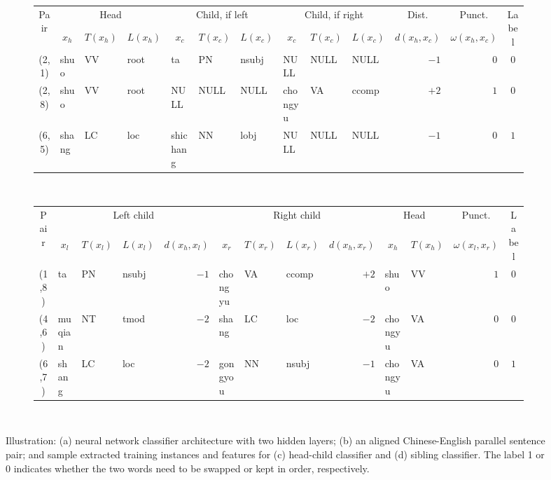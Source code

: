 \documentclass[letterpaper]{article}
\begin{document}
\begin{figure}[htb]
\begin{subfigure}[b]{1\textwidth}
{\centering
\footnotesize
\begin{tabular}{|c|l|l|l|l|l|l|l|l|l|r|r|c|}
\hline
\multicolumn{1}{|c|}{\multirow{2}{*}{Pair}} & \multicolumn{3}{c|}{Head} & \multicolumn{3}{c|}{Child, if left} & \multicolumn{3}{c|}{Child, if right} & \multicolumn{1}{c|}{Dist.} & \multicolumn{1}{c|}{Punct.} & \multicolumn{1}{c|}{\multirow{2}{*}{Label}} \\
\cline{2-12}
 & \multicolumn{1}{c|}{$x_h$} & \multicolumn{1}{c|}{$T(x_h)$} & \multicolumn{1}{c|}{$L(x_h)$} & \multicolumn{1}{c|}{$x_c$} & \multicolumn{1}{c|}{$T(x_c)$} & \multicolumn{1}{c|}{$L(x_c)$} & \multicolumn{1}{c|}{$x_c$} & \multicolumn{1}{c|}{$T(x_c)$} & \multicolumn{1}{c|}{$L(x_c)$} & \multicolumn{1}{c|}{$d(x_h,x_c)$} & \multicolumn{1}{c|}{$\omega(x_h,x_c)$} &  \\
\hline
(2, 1) & shuo & VV & root & ta & PN & nsubj & NULL & NULL & NULL & $-1$ & $0$ & $0$\\
(2, 8) & shuo & VV & root & NULL & NULL & NULL & chongyu & VA & ccomp & $+2$ & $1$ & $0$\\
(6, 5) & shang & LC & loc & shichang & NN & lobj & NULL & NULL & NULL & $-1$ & $0$ & $1$\\
\hline
\end{tabular}
\caption{~}
\label{fig:illustration_hcfeat}}
\end{subfigure}
\begin{subfigure}[b]{1\textwidth}
{\centering
\footnotesize
\begin{tabular}{|c|l|l|l|r|l|l|l|r|l|l|r|c|}
\hline
\multicolumn{1}{|c|}{\multirow{2}{*}{Pair}} & \multicolumn{4}{c|}{Left child} & \multicolumn{4}{c|}{Right child} & \multicolumn{2}{c|}{Head} & \multicolumn{1}{c|}{Punct.} & \multicolumn{1}{c|}{\multirow{2}{*}{Label}} \\
\cline{2-12}
 & \multicolumn{1}{c|}{$x_l$} & \multicolumn{1}{c|}{$T(x_l)$} & \multicolumn{1}{c|}{$L(x_l)$} & \multicolumn{1}{c|}{$d(x_h,x_l)$} & \multicolumn{1}{c|}{$x_r$} & \multicolumn{1}{c|}{$T(x_r)$} & \multicolumn{1}{c|}{$L(x_r)$} & \multicolumn{1}{c|}{$d(x_h,x_r)$} & \multicolumn{1}{c|}{$x_h$} & \multicolumn{1}{c|}{$T(x_h)$} & \multicolumn{1}{c|}{$\omega(x_l,x_r)$} & \\
\hline
(1,8) & ta & PN & nsubj & $-1$ & chongyu & VA & ccomp & $+2$ & shuo & VV & $1$ & $0$ \\
(4,6) & muqian & NT & tmod & $-2$ & shang & LC & loc & $-2$ & chongyu & VA & $0$ & $0$ \\
(6,7) & shang & LC & loc & $-2$ & gongyou & NN & nsubj & $-1$ & chongyu & VA & $0$ & $1$ \\
\hline
\end{tabular}
\caption{~}
\label{fig:illustration_sibfeat}}
\end{subfigure}
\caption{\label{fig:illustration} Illustration: (a) neural network classifier architecture with two hidden layers; (b) an aligned Chinese-English parallel sentence pair; and sample extracted training instances and features for (c) head-child classifier and (d) sibling classifier. The label 1 or 0 indicates whether the two words need to be swapped or kept in order, respectively.}
\end{figure}
\end{document}
